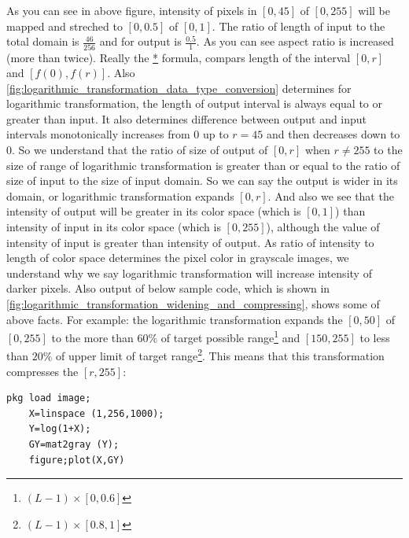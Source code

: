 \begin{enumerate}
    As you can see in above figure, intensity of pixels in $[0,45]$ of $[0,
    255]$ will be mapped and streched to $[0,0.5]$ of $[0,1]$. The ratio of
    length of input to the total domain is $\frac{46}{256}$ and for output is 
    $\frac{0.5}{1}$. As you can see aspect ratio is increased (more than twice).
    Really the \hyperref[relation:eq_1]{*} formula, compars length of the
    interval $[0,r]$ and $[f(0), f(r)]$. Also 
    \autoref{fig:logarithmic_transformation_data_type_conversion} determines for
    logarithmic transformation, the length of output interval is always equal to
    or greater than input. It also determines difference between output and
    input intervals monotonically increases from $0$ up to $r=45$ and then
    decreases down to $0$.  
So we understand that the ratio of size of output of $[0,r]$ when $r \not= 255$
to the size of range of logarithmic transformation is greater than or equal to
the ratio of size of input to the size of input domain. So we can say the output
is wider in its domain, or logarithmic transformation expands $[0,r]$. 
And also we see that the intensity of output will be greater in its
color space (which is $[0,1]$) than intensity of input in its color space (which
is $[0,255]$), although the value of intensity of input is greater than
intensity of output. As ratio of intensity to length of color space determines
the pixel color in grayscale images, we understand why we say logarithmic
transformation will increase intensity of darker pixels. 
Also output of below sample code, which is shown in 
\autoref{fig:logarithmic_transformation_widening_and_compressing}, shows 
some of above facts. For example: the logarithmic transformation expands 
the $[0,50]$ of $[0,255]$ to the more than $60\%$ of target possible 
range\footnote{$(L-1) \times [0, 0.6]$} and $[150,255]$ to less than 
$20\%$ of upper limit of target range\footnote{$(L-1) \times [0.8, 1]$}. This
means that this transformation compresses the $[r,255]$:
\begin{Verbatim}[frame=single,label=Octave lab:\ Logarithmic transformation ]
    pkg load image;
    X=linspace (1,256,1000);
    Y=log(1+X);
    GY=mat2gray (Y);
    figure;plot(X,GY)
\end{Verbatim}
\begin{figure}[htb!]

\end{figure}
\end{enumerate}
